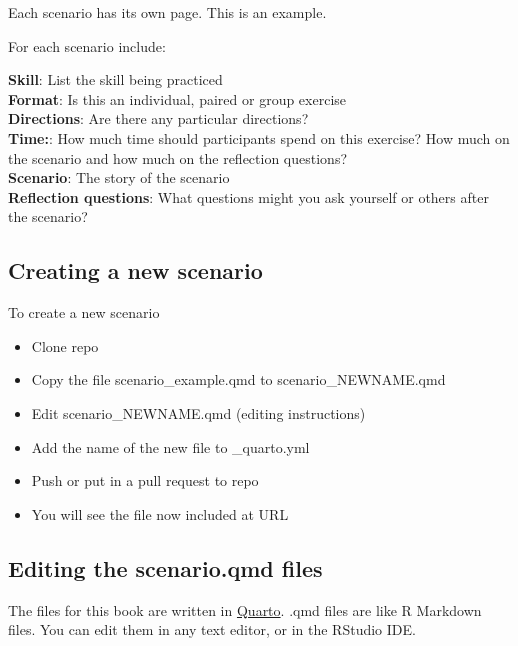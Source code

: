 \documentclass[
  letterpaper,
  DIV=11,
  numbers=noendperiod]{scrreprt}
\providecommand{\tightlist}{%
  \setlength{\itemsep}{0pt}\setlength{\parskip}{0pt}}
\begin{document}
Each scenario has its own page. This is an example.

For each scenario include:

\textbf{Skill}: List the skill being practiced\\
\textbf{Format}: Is this an individual, paired or group exercise\\
\textbf{Directions}: Are there any particular directions?\\
\textbf{Time:}: How much time should participants spend on this
exercise? How much on the scenario and how much on the reflection
questions?\\
\textbf{Scenario}: The story of the scenario\\
\textbf{Reflection questions}: What questions might you ask yourself or
others after the scenario?

\hypertarget{creating-a-new-scenario}{%
\subsection*{Creating a new scenario}\label{creating-a-new-scenario}}

To create a new scenario

\begin{itemize}
\tightlist
\item
  Clone repo
\item
  Copy the file scenario\_example.qmd to scenario\_NEWNAME.qmd
\item
  Edit scenario\_NEWNAME.qmd (editing instructions)
\item
  Add the name of the new file to \_quarto.yml
\item
  Push or put in a pull request to repo
\item
  You will see the file now included at URL
\end{itemize}

\hypertarget{editing-the-scenario.qmd-files}{%
\subsection*{Editing the scenario.qmd
files}\label{editing-the-scenario.qmd-files}}

The files for this book are written in
\href{https://quarto.org/}{Quarto}. .qmd files are like R Markdown
files. You can edit them in any text editor, or in the RStudio IDE.
\end{document}
